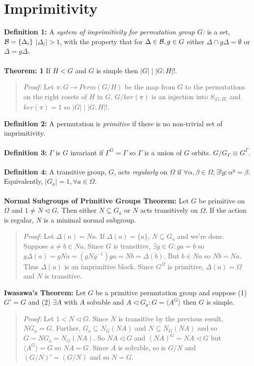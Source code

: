 \section {Imprimitivity}
{\bf Definition 1:}
A \emph{system of imprimitivity for permutation 
group $G$:} is a set, ${\cal B} = \{ \Delta_i\}$ $|\Delta_i| > 1$, with
the property that for $\Delta \in {\cal B}, g \in G$ either 
$\Delta \cap g \Delta = \emptyset$ or
$\Delta = g \Delta$.
\\
\\
{\bf Theorem: 1}
If $H<G$ and $G$ is simple then $|G| \mid |G:H|!$. 
\begin{quote}
\emph{Proof:}  
Let  $\pi: G \rightarrow Perm(G/H)$ be the map from $G$ to the permutations on the right
cosets of $H$ in $G$.  $G/ker(\pi)$ is an injection into $S_{|G:H|}$ and $ker(\pi)=1$ so
$|G| \mid |G:H|!$.
\end{quote}
{\bf Definition 2:}
A permutation is \emph{primitive} if there is no non-trivial set of imprimitivity.
\\
\\
{\bf Definition 3:}
$\Gamma$ is $G$ invariant if $\Gamma^G= \Gamma$ so $\Gamma$ is a union of $G$ orbits.
$G/G_{\Gamma} \equiv G^{\Gamma}$.
\\
\\
{\bf Definition 4:} A transitive group,
$G$, acts \emph{regularly} on $\Omega$ if $\forall \alpha, \beta \in \Omega,
\exists ! g: \alpha^g= \beta$.  Equivalently, $|G_a|=1, \forall a \in \Omega$.
\\
\\
{\bf Normal Subgroups of Primitive Groups Theorem:}  
Let $G$ be primitive on $\Omega$ and $1 \ne N \lhd G$.  Then either $N \subseteq G_a$ or
$N$ acts transitively on $\Omega$.  If the action is regular, $N$ is a minimal normal subgroup.
\begin{quote}
\emph{Proof:}  
Let $\Delta(a)= Na$.  If $\Delta(a)= \{ a \}$, $N \subseteq G_a$ and we're done.
Suppose $a \ne b \in Na$.  Since $G$ is transitive, $\exists g \in G: ga=b$ so
$g \Delta(a)= gNa= (gN g^{-1} ) ga= Nb = \Delta(b)$.  But $b \in Na$ so $Nb = Na$.
Thus $\Delta(a)$ is an imprimitive block.  Since $G^{\Omega}$ is primitive, $\Delta(a)= \Omega$
and $N$ is transitive.
\end{quote}
{\bf Iwasawa's Theorem:}  Let $G$ be a primitive permutation group and suppose (1) $G'=G$ and
(2) $\exists A$ with $A$ solvable  and $A \lhd G_a: G=
\langle A^G \rangle $ then $G$ is simple.
\begin{quote}
\emph{Proof:}  
Let $1 < N \lhd G$.  Since $N$ is transitive by the previous result, $NG_a=G$.  Further,
$G_a \subseteq N_G(NA)$ and $N \subseteq N_G(NA)$ and so $G= NG_a= N_G(NA)$. So $NA \lhd G$ and
$(NA)^G =NA \lhd G$ but $ \langle A^G \rangle = G$ so $NA=G$. 
Since $A$ is solvable, so is $G/N$ and
$(G/N)'=(G/N)$ and so $N = G$.
\end{quote}
